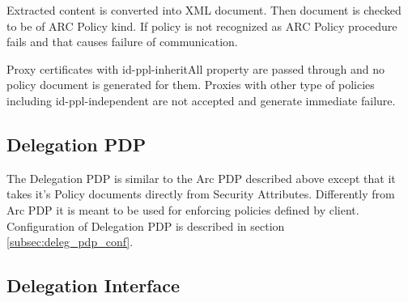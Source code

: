 \documentclass{article}                            %
\begin{document}
Extracted content is converted into XML document. Then document is checked to be of ARC Policy kind. If policy is not recognized as ARC Policy procedure fails and that causes failure of communication.

Proxy certificates with id-ppl-inheritAll \cite{x509proxy} property are passed through and no policy document is generated for them. Proxies with other type of policies including id-ppl-independent are not accepted and generate immediate failure.

\subsection{Delegation PDP} %
\label{subsec:delegation_pdp}
The Delegation PDP is similar to the Arc PDP described above except that it takes it's Policy documents directly from Security Attributes. Differently from Arc PDP it is meant to be used for enforcing policies defined by client. Configuration of Delegation PDP is described in section \ref{subsec:deleg_pdp_conf}.

\subsection{Delegation Interface} %
\label{subsec:delegation_interface}

\begin{figure}
\end{figure}
\end{document}
